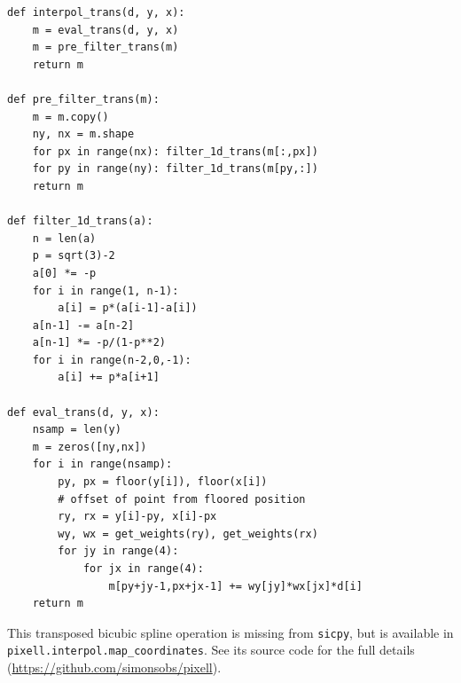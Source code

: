 \documentclass{article}
\newcommand{\code}[1]{\texttt{#1}}
\begin{document}
\begin{lstlisting}
def interpol_trans(d, y, x):
	m = eval_trans(d, y, x)
	m = pre_filter_trans(m)
	return m

def pre_filter_trans(m):
	m = m.copy()
	ny, nx = m.shape
	for px in range(nx): filter_1d_trans(m[:,px])
	for py in range(ny): filter_1d_trans(m[py,:])
	return m

def filter_1d_trans(a):
	n = len(a)
	p = sqrt(3)-2
	a[0] *= -p
	for i in range(1, n-1):
		a[i] = p*(a[i-1]-a[i])
	a[n-1] -= a[n-2]
	a[n-1] *= -p/(1-p**2)
	for i in range(n-2,0,-1):
		a[i] += p*a[i+1]

def eval_trans(d, y, x):
	nsamp = len(y)
	m = zeros([ny,nx])
	for i in range(nsamp):
		py, px = floor(y[i]), floor(x[i])
		# offset of point from floored position
		ry, rx = y[i]-py, x[i]-px
		wy, wx = get_weights(ry), get_weights(rx)
		for jy in range(4):
			for jx in range(4):
				m[py+jy-1,px+jx-1] += wy[jy]*wx[jx]*d[i]
	return m
\end{lstlisting}
This transposed bicubic spline operation is missing from \code{sicpy}, but is
available in \code{pixell.interpol.map\_coordinates}. See its source
code for the full details (\url{https://github.com/simonsobs/pixell}).
\end{document}
